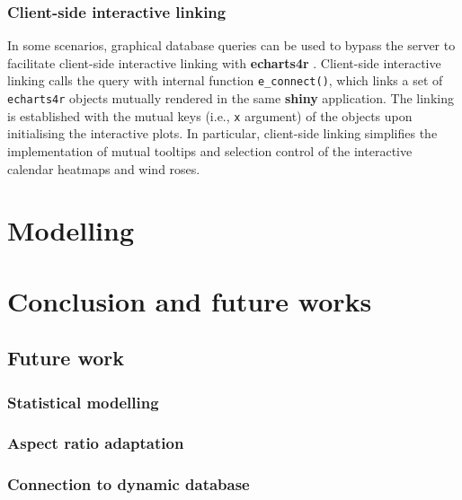 \documentclass{aucklandthesis}
\begin{document}
\hypertarget{client-side-interactive-linking}{%
\subsection{Client-side interactive linking}\label{client-side-interactive-linking}}

In some scenarios, graphical database queries can be used to bypass the server to facilitate client-side interactive linking with \textbf{echarts4r} \autocite{echarts4r}. Client-side interactive linking calls the query with internal function \texttt{e\_connect()}, which links a set of \texttt{echarts4r} objects mutually rendered in the same \textbf{shiny} application. The linking is established with the mutual keys (i.e., \texttt{x} argument) of the objects upon initialising the interactive plots. In particular, client-side linking simplifies the implementation of mutual tooltips and selection control of the interactive calendar heatmaps and wind roses.

\hypertarget{ch:model}{%
\chapter{Modelling}\label{ch:model}}

\hypertarget{ch:conclusion}{%
\chapter{Conclusion and future works}\label{ch:conclusion}}

\hypertarget{future-work}{%
\section{Future work}\label{future-work}}

\hypertarget{statistical-modelling}{%
\subsection{Statistical modelling}\label{statistical-modelling}}

\hypertarget{aspect-ratio-adaptation}{%
\subsection{Aspect ratio adaptation}\label{aspect-ratio-adaptation}}

\hypertarget{connection-to-dynamic-database}{%
\subsection{Connection to dynamic database}\label{connection-to-dynamic-database}}
\end{document}
